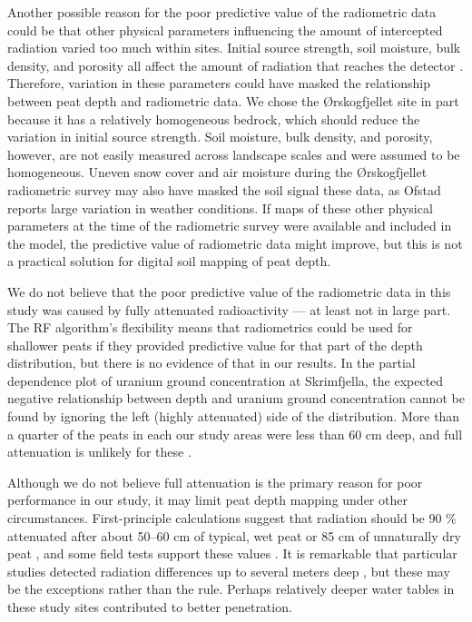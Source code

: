\documentclass[soil, manuscript]{copernicus}
\begin{document}
Another possible reason for the poor predictive value of the radiometric data could be that other physical parameters influencing the amount of intercepted radiation varied too much within sites.
Initial source strength, soil moisture, bulk density, and porosity all affect the amount of radiation that reaches the detector \citep{beamishGammaRayAttenuation2013, reinhardtGammaraySpectrometryVersatile2019}.
Therefore, variation in these parameters could have masked the relationship between peat depth and radiometric data.
We chose the Ørskogfjellet site in part because it has a relatively homogeneous bedrock, which should reduce the variation in initial source strength.
Soil moisture, bulk density, and porosity, however, are not easily measured across landscape scales and were assumed to be homogeneous.
Uneven snow cover and air moisture during the Ørskogfjellet radiometric survey may also have masked the soil signal these data, as Ofstad \citeyearpar{ofstadHelicopterborneMagneticRadiometric2015} reports large variation in weather conditions.
If maps of these other physical parameters at the time of the radiometric survey were available and included in the model, the predictive value of radiometric data might improve, but this is not a practical solution for digital soil mapping of peat depth.

We do not believe that the poor predictive value of the radiometric data in this study was caused by fully attenuated radioactivity --- at least not in large part.
The RF algorithm's flexibility means that radiometrics could be used for shallower peats if they provided predictive value for that part of the depth distribution, but there is no evidence of that in our results.
In the partial dependence plot of uranium ground concentration at Skrimfjella, the expected negative relationship between depth and uranium ground concentration cannot be found by ignoring the left (highly attenuated) side of the distribution.
More than a quarter of the peats in each our study areas were less than 60 cm deep, and full attenuation is unlikely for these \citep{beamishGammaRayAttenuation2013}.

Although we do not believe full attenuation is the primary reason for poor performance in our study, it may limit peat depth mapping under other circumstances.
First-principle calculations suggest that radiation should be 90 \% attenuated after about 50--60 cm of typical, wet peat or 85 cm of unnaturally dry peat \citep{beamishGammaRayAttenuation2013, beamishDetailedMappingPeat2024}, and some field tests support these values \citep{billenEignungGammaspektrometrieKartieren2015}.
It is remarkable that particular studies detected radiation differences up to several meters deep \citep{gatisMappingUplandPeat2019, kogantiMappingPeatDepth2023}, but these may be the exceptions rather than the rule.
Perhaps relatively deeper water tables in these study sites \citep[blanket bog, drained fen,][]{pricePeatlandRestorationHydrology2016} contributed to better penetration.
\end{document}
